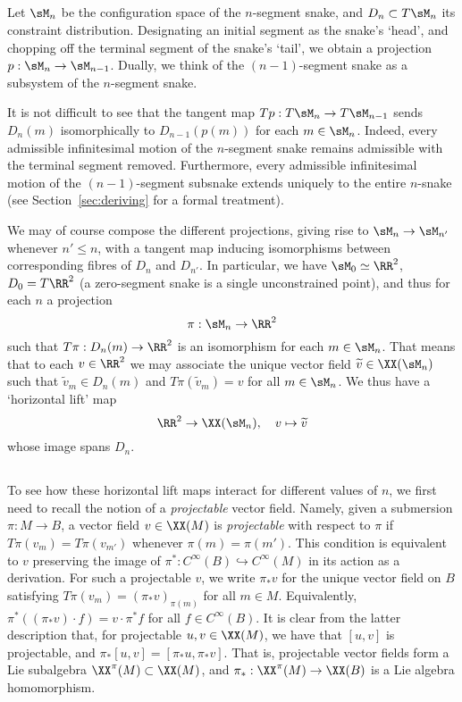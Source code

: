 
\subsection{}
Let $\sM_n$ be the configuration space of the $n$-segment snake,
and $D_n \subset T\sM_n$ its constraint distribution. Designating
an initial segment as the snake's `head', and chopping off the terminal segment
of the snake's `tail', we obtain a projection $p : \sM_n \to \sM_{n-1}$.
Dually, we think of the $(n-1)$-segment snake as a subsystem of the $n$-segment snake.

It is not difficult to see that the tangent map $Tp : T\sM_n \to T\sM_{n-1}$ sends
$D_n(m)$ isomorphically to $D_{n-1}(p(m))$ for each $m \in \sM_n$. Indeed,
every admissible infinitesimal motion of the $n$-segment snake remains admissible
with the terminal segment removed. Furthermore, every admissible infinitesimal
motion of the $(n-1)$-segment subsnake extends uniquely to the entire $n$-snake
(see Section~\ref{sec:deriving} for a formal treatment).

We may of course compose the different projections, giving rise to
$\sM_n \to \sM_{n'}$ whenever $n' \le n$, with a tangent map inducing
isomorphisms between corresponding fibres of $D_n$ and $D_{n'}$.
In particular, we have $\sM_0 \simeq \RR^2$, $D_0 = T\RR^2$ (a zero-segment snake is
a single unconstrained point), and thus for each $n$ a projection
$$ \pi : \sM_n \to \RR^2 $$
such that $T\pi : D_n(m) \to \RR^2$ is an isomorphism for each $m \in \sM_n$.
That means that to each $v \in \RR^2$ we may associate the unique
vector field $\widetilde v \in \XX(\sM_n)$ such that
$\widetilde v_m \in D_n(m)$ and
$T\pi (\widetilde v_m) = v$ for all $m \in \sM_n$. We thus have a `horizontal lift' map 
$$ \RR^2 \to \XX(\sM_n),\quad v \mapsto \widetilde v $$
whose image spans $D_n$. 

\subsection{}
To see how these horizontal lift maps interact for different values of $n$,
we first need to recall the notion of a \emph{projectable} vector field.
Namely, given a submersion $\pi : M \to B$, a vector field $v \in \XX(M)$
is \emph{projectable} with respect to $\pi$ if $T\pi (v_m) = T\pi (v_{m'})$ whenever
$\pi(m)=\pi(m')$. This condition is equivalent to $v$ preserving the
image of $\pi^* : C^\infty(B) \hookrightarrow C^\infty(M)$ in its action as a derivation.
For such a projectable $v$, we write $\pi_* v$ for the unique vector field on $B$
satisfying $T\pi(v_m) = (\pi_* v)_{\pi(m)}$ for all $m \in M$. Equivalently,
$\pi^* ((\pi_* v) \cdot f) = v \cdot \pi^*f$ for all $f \in C^\infty(B)$. 
It is clear from the latter description that, for projectable $u,v \in \XX(M)$,
we have that $[u,v]$ is projectable, and $\pi_* [u,v] = [\pi_*u, \pi_*v]$. That is,
projectable vector fields form a Lie subalgebra  $\XX^\pi(M) \subset \XX(M)$, and $\pi_* : \XX^\pi(M)\to\XX(B)$ 
is a Lie algebra homomorphism.

